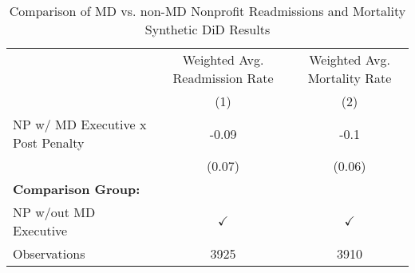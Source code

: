 \begin{table}[ht!]

\caption{\label{tab:MD_noMD_synth}Comparison of MD vs. non-MD Nonprofit Readmissions and Mortality Synthetic DiD Results}
\centering
\begin{tabular}[t]{lcc}
\toprule
\multicolumn{1}{c}{ } & \multicolumn{1}{c}{Weighted Avg. Readmission Rate} & \multicolumn{1}{c}{Weighted Avg. Mortality Rate} \\
\cmidrule(l{3pt}r{3pt}){2-2} \cmidrule(l{3pt}r{3pt}){3-3}
 & (1) & (2)\\
\midrule
NP w/ MD Executive x Post Penalty & -0.09 & -0.1\\
 & (0.07) & (0.06)\\
\textbf{Comparison Group:} &  & \\
NP w/out MD Executive & $\checkmark$ & $\checkmark$\\
Observations & 3925 & 3910\\
\bottomrule
\end{tabular}
\end{table}
